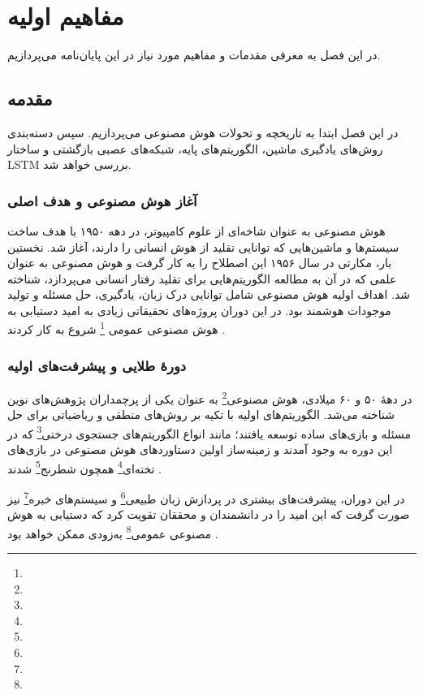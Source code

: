 \chapter{مفاهیم اولیه}

در این فصل به معرفی مقدمات و مفاهیم مورد نیاز در این پایان‌نامه می‌پردازیم.

\section{مقدمه}

در این فصل ابتدا به تاریخچه و تحولات هوش مصنوعی می‌پردازیم. سپس دسته‌بندی روش‌های یادگیری ماشین، الگوریتم‌های پایه، شبکه‌های عصبی بازگشتی و ساختار LSTM بررسی خواهد شد.



\subsection{آغاز هوش مصنوعی و هدف اصلی}

هوش مصنوعی به عنوان شاخه‌ای از علوم کامپیوتر، در دهه ۱۹۵۰ با هدف ساخت سیستم‌ها و ماشین‌هایی که توانایی تقلید از هوش انسانی را دارند، آغاز شد. نخستین بار، مکارتی در سال ۱۹۵۶ این اصطلاح را به کار گرفت \cite{mccarthy1956proposal} و هوش مصنوعی به عنوان علمی که در آن به مطالعه الگوریتم‌هایی برای تقلید رفتار انسانی می‌پردازد، شناخته شد. اهداف اولیه هوش مصنوعی شامل توانایی درک زبان، یادگیری، حل مسئله و تولید موجودات هوشمند بود. در این دوران پروژه‌های تحقیقاتی زیادی به امید دستیابی به هوش مصنوعی عمومی \footnote{}
شروع به کار کردند \cite{crevier1993ai,nilsson2010quest}.

\subsection{دورهٔ طلایی و پیشرفت‌های اولیه}

در دههٔ ۵۰ و ۶۰ میلادی، هوش مصنوعی\footnote{} به عنوان یکی از پرچمداران پژوهش‌های نوین شناخته می‌شد. الگوریتم‌های اولیه با تکیه بر روش‌های منطقی و ریاضیاتی برای حل مسئله و بازی‌های ساده توسعه یافتند؛ مانند انواع الگوریتم‌های جستجوی درختی\footnote{} که در این دوره به وجود آمدند و زمینه‌ساز اولین دستاوردهای هوش مصنوعی در بازی‌های تخته‌ای\footnote{} همچون شطرنج\footnote{} شدند \cite{newell1959report}. 

در این دوران، پیشرفت‌های بیشتری در پردازش زبان طبیعی\footnote{} و سیستم‌های خبره\footnote{} نیز صورت گرفت که این امید را در دانشمندان و محققان تقویت کرد که دستیابی به هوش مصنوعی عمومی\footnote{} به‌زودی ممکن خواهد بود \cite{feigenbaum1983handbook}.


